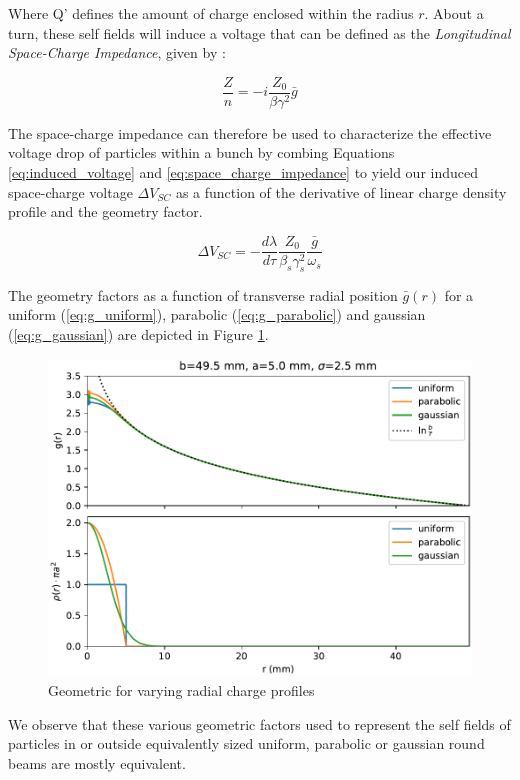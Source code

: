 Where Q' defines the amount of charge enclosed within the radius $r$. About a turn, these self fields will induce a voltage that can be defined as the \textit{Longitudinal Space-Charge Impedance}, given by \cite{lee_accelerator_2004}:

\begin{equation}
    \frac{Z}{n} = -i\frac{Z_0}{\beta\gamma^2}\bar{g}
    \label{eq:space_charge_impedance}
\end{equation}

The space-charge impedance can therefore be used to characterize the effective voltage drop of particles within a bunch by combing Equations \ref{eq:induced_voltage} and  \ref{eq:space_charge_impedance} to yield our induced space-charge voltage $\Delta V_{SC}$ as a function of the derivative of linear charge density profile and the geometry factor.

$$\Delta V_{SC} = -\frac{d\lambda}{d\tau}\frac{Z_0}{\beta_s\gamma_s^2}\frac{\bar{g}}{\omega_s}$$

The geometry factors as a function of transverse radial position $\bar{g}(r)$ for a uniform (\ref{eq:g_uniform}), parabolic (\ref{eq:g_parabolic}) and gaussian (\ref{eq:g_gaussian}) are depicted in Figure \ref{fig:geometry_factors}.

\begin{figure}
    \centering
    \includegraphics{./figs/geometric_factors.pdf}
    \caption{Geometric for varying radial charge profiles}
    \label{fig:geometry_factors}
\end{figure}

We observe that these various geometric factors used to represent the self fields of particles in or outside equivalently sized uniform, parabolic or gaussian round beams are mostly equivalent. 

